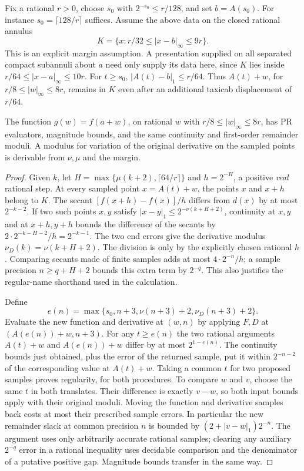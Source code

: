 Fix a rational $r>0$, choose $s_0$ with $2^{-s_0}\le r/128$, and set
$b=A(s_0)$. For instance $s_0=\lceil128/r\rceil$ suffices. Assume the
above data on the closed rational annulus
\[
 K=\{x:r/32\le |x-b|_\infty\le9r\}.
\]
This is an explicit margin assumption. A presentation supplied on all
separated compact subannuli about $a$ need only supply its data here, since
$K$ lies inside $r/64\le|x-a|_\infty\le10r$. For $t\ge s_0$,
$|A(t)-b|_1\le r/64$. Thus $A(t)+w$, for
$r/8\le |w|_\infty\le8r$, remains in $K$ even after an additional
taxicab displacement of $r/64$.

\begin{lemma}\label{lem:analytic-shift}
The function $g(w)=f(a+w)$, on rational $w$ with
$r/8\le |w|_\infty\le8r$, has PR evaluators, magnitude bounds,
and the same continuity and first-order remainder moduli. A modulus for
variation of the original derivative on the sampled points is derivable
from $\nu,\mu$ and the margin.
\end{lemma}
\begin{proof}
Given $k$, let $H=\max\{\mu(k+2),\lceil64/r\rceil\}$ and
$h=2^{-H}$, a positive \emph{real} rational step. At every sampled point
$x=A(t)+w$, the points $x$ and $x+h$ belong to $K$. The secant
$[f(x+h)-f(x)]/h$ differs from $d(x)$ by at most $2^{-k-2}$. If two
such points $x,y$ satisfy $|x-y|_1\le2^{-\nu(k+H+2)}$, continuity at
$x,y$ and at $x+h,y+h$ bounds the difference of the secants by
$2\cdot2^{-k-H-2}/h=2^{-k-1}$. The two end errors give the derivative
modulus $\nu_D(k)=\nu(k+H+2)$. The division is only by the explicitly
chosen rational $h$. Comparing secants made of finite samples adds at
most $4\cdot 2^{-n}/h$; a sample precision $n\ge q+H+2$ bounds this
extra term by $2^{-q}$. This also justifies the regular-name shorthand
used in the calculation.

Define
\[
 e(n)=\max\{s_0,n+3,\nu(n+3)+2,\nu_D(n+3)+2\}.
\]
Evaluate the new function and derivative at $(w,n)$ by applying $F,D$
at $(A(e(n))+w,n+3)$. For any $t\ge e(n)$ the two rational arguments
$A(t)+w$ and $A(e(n))+w$ differ by at most $2^{1-e(n)}$. The
continuity bounds just obtained, plus the error of the returned sample,
put it within $2^{-n-2}$ of the corresponding value at $A(t)+w$.
Taking a common $t$ for two proposed samples proves regularity, for
both procedures. To compare $w$ and $v$, choose the same $t$ in both
translates. Their difference is exactly $v-w$, so both input bounds
apply with their original moduli. Moving the function and derivative
samples back costs at most their prescribed sample errors. In particular
the new remainder slack at common precision $n$ is bounded by
$(2+|v-w|_1)2^{-n}$. The argument uses only arbitrarily accurate
rational samples; clearing any auxiliary $2^{-q}$ error in a rational
inequality uses decidable comparison and the denominator of a putative
positive gap. Magnitude bounds transfer in the same way.
\end{proof}

